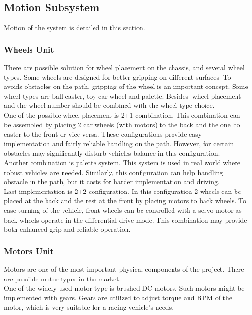 \documentclass[a4paper,12pt]{article}
\begin{document}
\subsection{Motion Subsystem}
Motion of the system is detailed in this section.
\subsubsection{Wheels Unit}
There are possible solution for wheel placement on the chassis, and several wheel types. Some wheels are designed for better gripping on different surfaces. To avoids obstacles on the path, gripping of the wheel is an important concept. Some wheel types are ball caster, toy car wheel and palette. Besides, wheel placement and the wheel number should be combined with the wheel type choice. \\

One of the possible wheel placement is 2+1 combination. This combination can be assembled by placing 2 car wheels (with motors) to the back and the one boll caster to the front or vice versa. These configurations provide easy implementation and fairly reliable handling on the path. However, for certain obstacles may significantly disturb vehicles balance in this configuration.\\

Another combination is palette system. This system is used in real world where robust vehicles are needed. Similarly, this configuration can help handling obstacle in the path, but it costs for harder implementation and driving.\\

Last implementation is 2+2 configuration. In this configuration 2 wheels can be placed at the back and the rest at the front by placing motors to back wheels. To ease turning of the vehicle, front wheels can be controlled with a servo motor as back wheels operate in the differential drive mode. This combination may provide both enhanced grip and reliable	 operation. \\
\subsubsection{Motors Unit}
Motors are one of the most important physical components of the project. There are possible motor types in the market.\\

One of the widely used motor type is brushed DC motors. Such motors might be implemented with gears. Gears are utilized to adjust torque and RPM of the motor, which is very suitable for a racing vehicle's needs. \\
\end{document}

